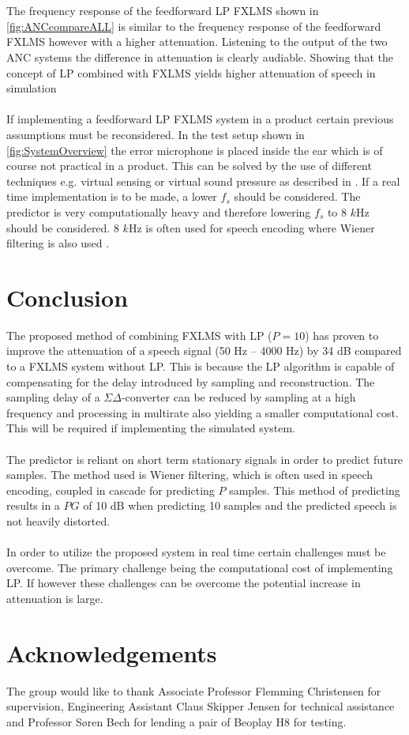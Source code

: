 \\\\
The frequency response of the feedforward LP FXLMS shown in \autoref{fig:ANCcompareALL} is similar to the frequency response of the feedforward FXLMS however with a higher attenuation. Listening to the output of the two ANC systems the difference in attenuation is clearly audiable. Showing that the concept of LP combined with FXLMS yields higher attenuation of speech in simulation     
\\\\
If implementing a feedforward LP FXLMS system in a product certain previous assumptions must be reconsidered. In the test setup shown in \autoref{fig:SystemOverview} the error microphone is placed inside the ear which is of course not practical in a product. This can be solved by the use of different techniques e.g. virtual sensing or virtual sound pressure as described in \cite{Hansen2}. If a real time implementation is to be made, a lower $f_s$ should be considered. The predictor is very computationally heavy and therefore lowering $f_s$ to 8 $k$Hz should be considered. 8 $k$Hz is often used for speech encoding where Wiener filtering is also used \cite{Speech}.



\section{Conclusion}
The proposed method of combining FXLMS with LP ($P=10$) has proven to improve the attenuation of a speech signal (50 Hz -- 4000 Hz) by 34 dB compared to a FXLMS system without LP. This is because the LP algorithm is capable of compensating for the delay introduced by sampling and reconstruction. The sampling delay of a $\Sigma\Delta$-converter can be reduced by sampling at a high frequency and processing in multirate also yielding a smaller computational cost. This will be required if implementing the simulated system.    
\\\\
The predictor is reliant on short term stationary signals in order to predict future samples. The method used is Wiener filtering, which is often used in speech encoding, coupled in cascade for predicting $P$ samples. This method of predicting results in a $PG$ of 10 dB when predicting 10 samples and the predicted speech is not heavily distorted.    
\\\\
In order to utilize the proposed system in real time certain challenges must be overcome. The primary challenge being the computational cost of implementing LP. If however these challenges can be overcome the potential increase in attenuation is large.   



\section*{Acknowledgements}
The group would like to thank Associate Professor Flemming Christensen for supervision, Engineering Assistant Claus Skipper Jensen for technical assistance and Professor Søren Bech for lending a pair of Beoplay H8 for testing. 
